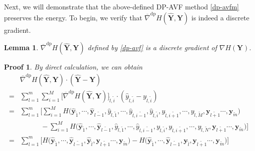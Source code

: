 \documentclass[fleqn,11pt]{elsarticle}
\numberwithin{equation}{section}
\newtheorem{lem}{Lemma}[section]
\newtheorem*{prf}{Proof}
\begin{document}
Next, we will demonstrate that the above-defined DP-AVF method \eqref{dp-avfm} preserves the energy. To begin, we verify that $\overline{\nabla}^{\text{dp}} H(\widehat{\bm{Y}}, \bm{Y})$ is indeed a discrete gradient.
\begin{lem}\label{lem1}
	$\overline{\nabla}^{\text{dp}} H(\widehat{\bm{Y}}, \bm{Y})$ defined by \eqref{dp-avf} is a discrete gradient of $\nabla H(\bm{Y})$.
\end{lem}

\begin{prf}
	By direct calculation, we can obtain
	\[
		\begin{aligned}
			  & \overline{\nabla}^{\text{dp}}H(\widehat{\bm Y},\bm Y)\cdot (\widehat{\bm Y}-\bm Y)                                                                                                                                                                                                                                                                                                                      \\
			= & \sum_{{l}=1}^{m}\sum_{{i}=1}^{M}\Big[\overline{\nabla}^{\text{dp}}H(\widehat{\bm Y},\bm Y)\Big]_{\widetilde{l},\widetilde{i}}\cdot (\widehat{y}_{\widetilde{l},\widetilde{i}}-y_{\widetilde{l},\widetilde{i}})                                                                                                                                                                                          \\
			= & \sum_{{l}=1}^{m}\Bigg[\sum_{{i}=1}^{M}H\big(\widehat{\bm y}_{\widetilde{1}}, \cdots, \widehat{\bm y}_{\widetilde{l-1}}, \widehat{y}_{\widetilde{l},\widetilde{1}},\cdots,\widehat{y}_{\widetilde{l},\widetilde{i-1}}, \widehat{y}_{\widetilde{l},\widetilde{i}}, {y}_{\widetilde{l},\widetilde{i+1}},\cdots, y_{\widetilde{l},\widetilde{M}}, \bm y_{\widetilde{l+1}}\cdots, \bm y_{\widetilde{m}}\big) \\
			  & \qquad\quad -\sum_{{i}=1}^{M}H\big(\widehat{\bm y}_{\widetilde{1}}, \cdots, \widehat{\bm y}_{\widetilde{l-1}}, \widehat{y}_{\widetilde{l},\widetilde{1}},\cdots, \widehat{y}_{\widetilde{l}, \widetilde{i-1}}, y_{\widetilde{l},\widetilde{i}}, {y}_{\widetilde{l},\widetilde{i+1}},\cdots, y_{\widetilde{l},\widetilde{N}}, \bm y_{\widetilde{l+1}}\cdots, \bm y_{\widetilde{m}}\big)\Bigg]            \\
			= & \sum_{{l}=1}^{m}\Big[H\big(\widehat{\bm y}_{\widetilde{1}}, \cdots, \widehat{\bm y}_{{\widetilde{l-1}}}, \widehat{\bm y}_{\widetilde{l}},\bm y_{\widetilde{l+1}}\cdots, \bm y_{\widetilde{m}}\big)-H\big(\widehat{\bm y}_{\widetilde{1}}, \cdots, \widehat{\bm y}_{{\widetilde{l-1}}}, \bm y_{\widetilde{l}},\bm y_{\widetilde{l+1}}\cdots, \bm y_{\widetilde{m}}\big)\Big]                             \\

\end{aligned}\]
\end{prf}
\end{document}
